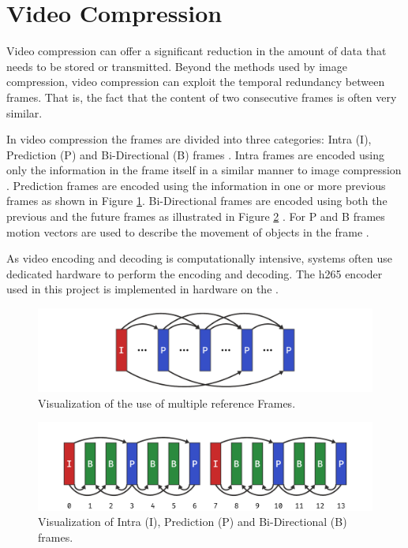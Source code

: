 \section{Video Compression}
Video compression can offer a significant reduction in the amount of data that needs to be stored or transmitted.
Beyond the methods used by image compression, video compression can exploit the temporal redundancy between frames.
That is, the fact that the content of two consecutive frames is often very similar.

In video compression the frames are divided into three categories: Intra (I), Prediction (P) and Bi-Directional (B) frames \cite{vijayanagarBframesDifferencesUse2020}.
Intra frames are encoded using only the information in the frame itself in a similar manner to image compression \cite{vijayanagarBframesDifferencesUse2020}.
Prediction frames are encoded using the information in one or more previous frames as shown in Figure \ref{fig:multiple_reference_frames}.
Bi-Directional frames are encoded using both the previous and the future frames as illustrated in Figure \ref{fig:ipb_frames} \cite{vijayanagarBframesDifferencesUse2020}.
For P and B frames motion vectors are used to describe the movement of objects in the frame \cite{vijayanagarBframesDifferencesUse2020}.

As video encoding and decoding is computationally intensive, systems often use dedicated hardware to perform the encoding and decoding.
The \gls{h265} encoder used in this project is implemented in hardware on the \jx \cite[16]{nvidiaNVIDIAJetsonAGX2019}.

\begin{figure}
    \centering
    \includegraphics[width=\textwidth]{figures/encoding/multiple_references.pdf}
    \caption{Visualization of the use of multiple reference Frames.}
    \label{fig:multiple_reference_frames}
\end{figure}

\begin{figure}
    \centering
    \includegraphics[width=\textwidth]{figures/encoding/ipb_frames.pdf}
    \caption{Visualization of Intra (I), Prediction (P) and Bi-Directional (B) frames.}
    \label{fig:ipb_frames}
\end{figure}

